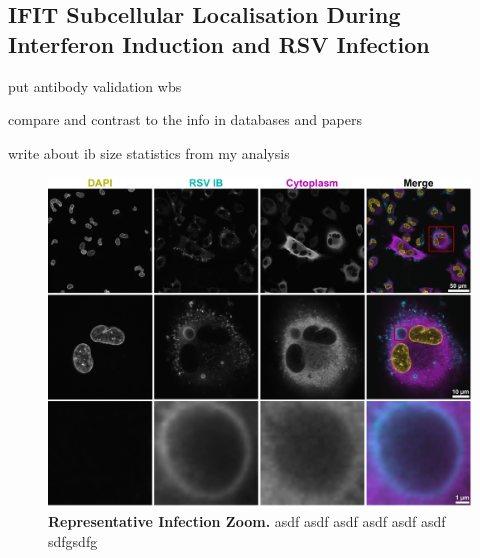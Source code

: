 \subsection{IFIT Subcellular Localisation During Interferon Induction and RSV Infection} \label{subsec:IFIT Subcellular Localisation During Interferon INduction and RSV Infection}
put antibody validation wbs

compare and contrast to the info in databases and papers

write about ib size statistics from my analysis

\begin{figure}
    \centering
    \includegraphics[width=1\linewidth]{09. Chapter 4/Figs/01. Localisation introduction/01. IB-zooms.pdf}
    \caption[Representative Infection Zoom.]{\textbf{Representative Infection Zoom.} asdf asdf asdf asdf asdf asdf sdfgsdfg}
    \label{fig:Representative Infection Zoom}
\end{figure}


